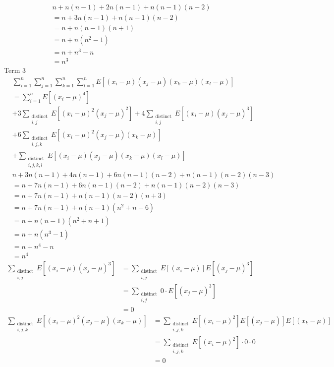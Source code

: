 \documentclass[12pt,a4paper]{report}
\begin{document}
\begin{align*}
& n + n (n-1) + 2 n (n-1) + n (n-1)(n-2) \\
&= n + 3 n (n-1) + n (n-1)(n-2) \\
&= n + n(n-1)(n+1) \\
&= n + n(n^2-1) \\
&= n + n^3 - n \\
&= n^3
\end{align*}
Term 3
\begin{align*}
& \sum_{i=1}^n \sum_{j=1}^n \sum_{k=1}^n \sum_{l=1}^n E[(x_i - \mu)(x_j - \mu)(x_k - \mu)(x_l - \mu)] \\
&=\sum_{i=1}^n E[(x_i - \mu)^4] \\
&+ 3 \sum_{\substack{\text{distinct} \\ i,j}} E[(x_i - \mu)^2 (x_j - \mu)^2]
 + 4 \sum_{\substack{\text{distinct} \\ i,j}} E[(x_i - \mu) (x_j - \mu)^3] \\
&+ 6 \sum_{\substack{\text{distinct} \\ i,j,k}} E[(x_i - \mu)^2 (x_j - \mu) (x_k - \mu)] \\
&+ \sum_{\substack{\text{distinct} \\ i,j,k,l}} E[(x_i - \mu)(x_j - \mu)(x_k - \mu)(x_l - \mu)]
\end{align*}
\begin{align*}
& n + 3 n (n-1) + 4 n (n-1) + 6 n (n-1)(n-2) +  n (n-1)(n-2)(n-3) \\
&= n + 7 n (n-1) + 6 n (n-1)(n-2) +  n (n-1)(n-2)(n-3) \\
&= n + 7 n (n-1) + n (n-1)(n-2)(n+3) \\
&= n + 7 n (n-1) + n (n-1)(n^2 +n -6) \\
&= n + n (n-1)(n^2 +n +1) \\
&= n + n (n^3 -1) \\
&= n + n^4 -n \\
&= n^4
\end{align*}
\begin{align*}
\sum_{\substack{\text{distinct} \\ i,j}} E[(x_i - \mu) (x_j - \mu)^3]
&=\sum_{\substack{\text{distinct} \\ i,j}} E[(x_i - \mu)] E[(x_j - \mu)^3] \\
&=\sum_{\substack{\text{distinct} \\ i,j}} 0 \cdot E[(x_j - \mu)^3] \\
&= 0
\end{align*}
\begin{align*}
\sum_{\substack{\text{distinct} \\ i,j,k}} E[(x_i - \mu)^2 (x_j - \mu) (x_k - \mu)]
&= \sum_{\substack{\text{distinct} \\ i,j,k}} E[(x_i - \mu)^2] E[(x_j - \mu)] E[(x_k - \mu)] \\
&= \sum_{\substack{\text{distinct} \\ i,j,k}} E[(x_i - \mu)^2] \cdot 0 \cdot 0 \\
&= 0
\end{align*}
\end{document}
